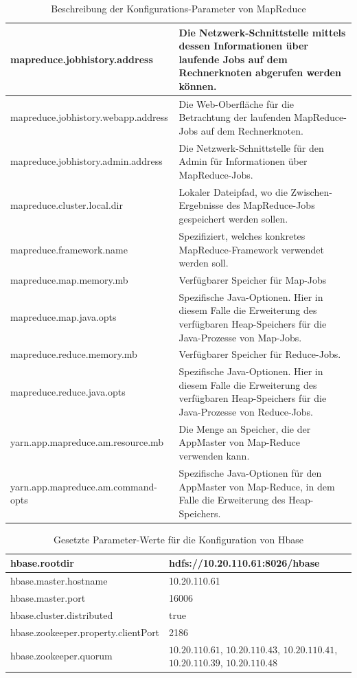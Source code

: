 \begin{table}
	\begin{tabularx}{\textwidth}{| X | X |} \hline
	mapreduce.jobhistory.address & Die Netzwerk-Schnittstelle mittels dessen Informationen
	über laufende Jobs auf dem Rechnerknoten abgerufen werden können. \\ \hline
	mapreduce.jobhistory.webapp.address & Die Web-Oberfläche für die Betrachtung
	der laufenden MapReduce-Jobs auf dem Rechnerknoten.\\ \hline
	mapreduce.jobhistory.admin.address & Die Netzwerk-Schnittstelle für den Admin für
	Informationen über MapReduce-Jobs.\\ \hline
	mapreduce.cluster.local.dir &  Lokaler Dateipfad, wo die Zwischen-Ergebnisse des MapReduce-Jobs gespeichert werden sollen.\\ \hline
	mapreduce.framework.name &  Spezifiziert, welches konkretes MapReduce-Framework
	verwendet werden soll. \\ \hline
	mapreduce.map.memory.mb &  Verfügbarer Speicher für Map-Jobs\\ \hline
	mapreduce.map.java.opts & Spezifische Java-Optionen. Hier in diesem Falle die Erweiterung
	des verfügbaren Heap-Speichers für die Java-Prozesse von Map-Jobs.\\ \hline
	mapreduce.reduce.memory.mb &  Verfügbarer Speicher für Reduce-Jobs.\\ \hline
	mapreduce.reduce.java.opts & Spezifische Java-Optionen. Hier in diesem Falle die Erweiterung
	des verfügbaren Heap-Speichers für die Java-Prozesse von Reduce-Jobs. \\ \hline
	yarn.app.mapreduce.am.resource.mb & Die Menge an Speicher, die der AppMaster von
	Map-Reduce verwenden kann. \\ \hline
	yarn.app.mapreduce.am.command-opts &  Spezifische Java-Optionen für den AppMaster
	von Map-Reduce, in dem Falle die Erweiterung des Heap-Speichers.\\ \hline
	\end{tabularx}
	\caption{Beschreibung der Konfigurations-Parameter von MapReduce}
	\label{config:mapreduceDescription}
\end{table}

\begin{table}
	\begin{tabularx}{\textwidth}{| X | X |} \hline
	hbase.rootdir & hdfs://10.20.110.61:8026/hbase \\ \hline
	hbase.master.hostname & 10.20.110.61 \\ \hline
	hbase.master.port & 16006 \\ \hline
	hbase.cluster.distributed & true \\ \hline
	hbase.zookeeper.property.clientPort & 2186 \\ \hline
	hbase.zookeeper.quorum & $10.20.110.61$, $10.20.110.43$, $10.20.110.41$, $10.20.110.39$, $10.20.110.48$ \\ \hline
	\end{tabularx}
	\caption{Gesetzte Parameter-Werte für die Konfiguration von Hbase}
	\label{config:hbaseValues}
\end{table}

